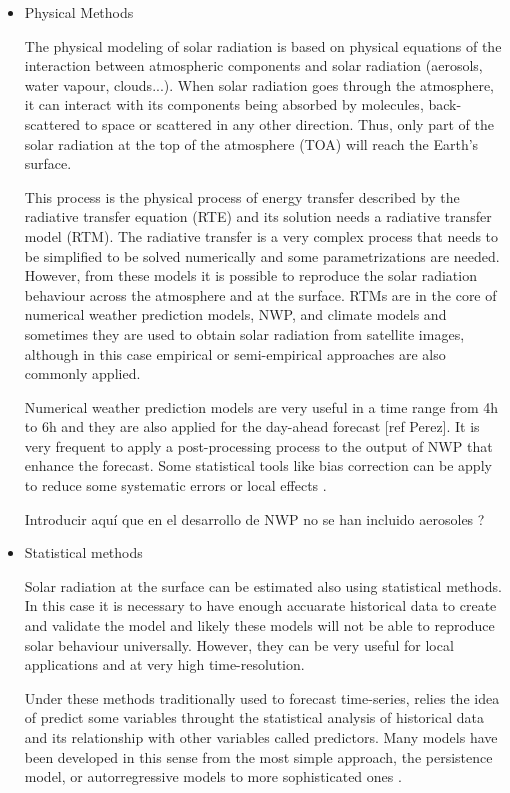 \begin{itemize}
\item{Physical Methods}

The physical modeling of solar radiation is based on physical equations of the interaction between atmospheric components and solar radiation (aerosols, water vapour, clouds...). When solar radiation goes through the atmosphere, it can interact with its components being absorbed by molecules, back-scattered to space or scattered in any other direction. Thus, only part of the solar radiation at the top of the atmosphere (TOA) will reach the Earth's surface.

This process is the physical process of energy transfer described by the radiative transfer equation (RTE) and its solution needs a radiative transfer model (RTM). The radiative transfer is a very complex process that needs to be simplified to be solved numerically and some parametrizations are needed. However, from these models it is possible to reproduce the solar radiation behaviour across the atmosphere and at the surface. RTMs are in the core of numerical weather prediction models, NWP, and climate models and sometimes they are used to obtain solar radiation from satellite images, although in this case empirical or semi-empirical approaches are also commonly applied.

Numerical weather prediction models are very useful in a time range from 4h to 6h and they are also applied for the day-ahead forecast [ref Perez]. It is very frequent to apply a post-processing process to the output of NWP that enhance the forecast. Some statistical tools like bias correction can be apply to reduce some systematic errors or local effects \cite*{Diagne2013}.

{\color{red} Introducir aquí que en el desarrollo de NWP no se han incluido aerosoles ?}

\item{Statistical methods}

Solar radiation at the surface can be estimated also using statistical methods. In this case it is necessary to have enough accuarate historical data to create and validate the model and likely these models will not be able to reproduce solar behaviour universally. However, they can be very useful for local applications and at very high time-resolution.

Under these methods traditionally used to forecast time-series, relies the idea of predict some variables throught the statistical analysis of historical data and its relationship with other variables called predictors. Many models have been developed in this sense from the most simple approach, the persistence model, or autorregressive models to more sophisticated ones \cite*{Reikard2009, bacher2009, Inman2013}. 


\end{itemize}
